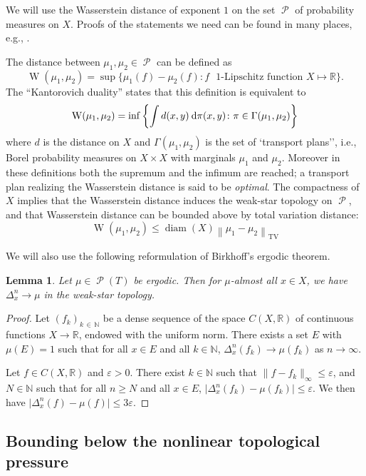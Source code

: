 \documentclass[10pt]{amsart}
\newtheorem{lemm}[theo]{Lemma}\newtheorem{prop}[theo]{Proposition}\newtheorem{coro}[theo]{Corollary}\newtheorem{conj}[theo]{Conjecture}
\theoremstyle{definition}\newtheorem{defi}[theo]{Definition}\newtheorem{rema}[theo]{Remark}\newtheorem{exam}[theo]{Example}\newtheorem{exem}[theo]{Example}\newtheorem{nota}[theo]{Notation}
\theoremstyle{plain}
\theoremstyle{plain}
\newcommand\eps{\varepsilon}
\newcommand{\TV}{\mathrm{TV}}
\newcommand{\wass}{\operatorname{W}}
\newcommand{\diam}{\operatorname{diam}}
\newcommand\Prob{{\operatorname{\mathscr{P}}}}
\newcommand*{\dd} {\relax\ifnum\lastnodetype>0\mskip\medmuskip\fi\mathrm{d}}
\newcommand*\8{\infty}
\newcommand\NN{\mathbb{N}}
\newcommand\RR{\mathbb{R}}
\begin{document}
We will use the Wasserstein distance of exponent $1$ on the set $\Prob$ of probability measures on $X$. Proofs of the statements we need can be found in many places, e.g., \cite{Villani-book}.

The distance between $\mu_1,\mu_2\in\Prob$ can be defined as
\[
\wass(\mu_1,\mu_2) = \sup \big\{\mu_1(f)-\mu_2(f) \colon f \text{ $1$-Lipschitz function } X\mapsto \RR \big\}.
\]
The ``Kantorovich duality'' states that this definition is equivalent to
\[
\wass(\mu_1,\mu_2) = \inf \left\{\int d(x,y) \dd \pi(x,y) \colon \pi\in\Gamma(\mu_1,\mu_2) \right\}
\]
where $d$ is the distance on $X$ and $\Gamma(\mu_1,\mu_2)$ is the set of `transport plans'', i.e., Borel probability measures on $X\times X$ with marginals $\mu_1$ and $\mu_2$. Moreover in these definitions both the supremum and the infimum are reached; a transport plan realizing the Wasserstein distance is said to be \emph{optimal}. The compactness of $X$ implies that the Wasserstein distance induces the weak-star topology on $\Prob$, and that Wasserstein distance can be bounded above by total variation distance:
\[
\wass(\mu_1,\mu_2) \le \diam(X) \left\lVert \mu_1-\mu_2\right\rVert_{\TV}
\]

We will also use the following reformulation of Birkhoff's ergodic theorem.

\begin{lemm}\label{l:Birkhoff}
Let $\mu\in\Prob(T)$ be ergodic. Then for $\mu$-almost all $x\in X$, we have $\Delta_x^n \to \mu$ in the weak-star topology.
\end{lemm}

\begin{proof}
Let $(f_k)_{k\,\in\,\NN}$ be a dense sequence of the space $C(X,\RR)$ of continuous functions $X\to\RR$, endowed with the uniform norm. There exists a set $E$ {with $\mu(E)=1$} such that for all $x\in E$ and all $k\in\NN$, $\Delta_x^n(f_k) \to \mu(f_k)$ as $n\to\infty$.

Let $f\in C(X,\RR)$ and $\eps>0$. There exist $k\in\NN$ such that $\lVert f-f_k\rVert_\infty \le \eps$, and $N\in\NN$ such that for all $n\ge N$ and all $x\in E$, $\lvert \Delta_x^n(f_k)-\mu(f_k)\rvert\le\eps$. We then have $\lvert \Delta_x^n(f)-\mu(f)\rvert \le 3\eps$.
\end{proof}


\subsection{Bounding below the nonlinear topological pressure}
\end{document}
